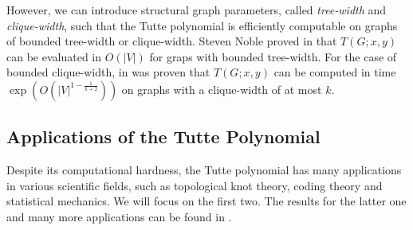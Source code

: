 \documentclass[12pt,a4paper, twoside, autooneside=false]{scrartcl}
\theoremstyle{definition}
\theoremstyle{remark}
\numberwithin{equation}{section}
\newcommand{\M}{\mathcal{M}} %
\begin{document}
However, we can introduce structural graph parameters, called \textit{tree-width} and \textit{clique-width}, such that the Tutte polynomial is efficiently computable on graphs of bounded tree-width or clique-width. Steven Noble proved in \cite{No1998} that $T(G;x,y)$ can be evaluated in $\mathit{O}(|V|)$ for graps with bounded tree-width. For the case of bounded clique-width, in \cite{Hl2006} was proven that $T(G;x,y)$ can be computed in time $\exp(\mathit{O}(|V|^{1 - \frac{1}{k + 2}}))$ on graphs with a clique-width of at most $k$. %
\subsection{Applications of the Tutte Polynomial}
Despite its computational hardness, the Tutte polynomial has many applications in various scientific fields, such as topological knot theory, coding theory and statistical mechanics. We will focus on the first two. The results for the latter one and many more applications can be found in \cite{ElMo2022}.
\end{document}
